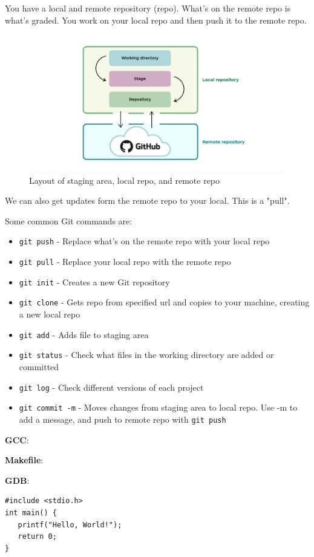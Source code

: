 \documentclass[nobib]{tufte-handout}
\newcommand{\defn}[2]{\noindent\textbf{#1}:\ #2}
\begin{document}

You have a local and remote repository (repo). What's on the 
remote repo is what's graded. You work on your local repo 
and then push it to the remote repo. 
\begin{figure}
   \centering
   \includegraphics{images/workingdir-stage-local-remote.png}
   \caption{Layout of staging area, local repo, and remote repo}
   \label{fig:wdstagelocalremote} 
\end{figure}

We can also get updates form the remote repo to your local.
This is a "pull". 

Some common Git commands are:
\begin{itemize}
   \item \texttt{git push} - Replace what's on the remote repo with your local repo
   \item \texttt{git pull} - Replace your local repo with the remote repo
   \item \texttt{git init} - Creates a new Git repository
   \item \texttt{git clone} - Gets repo from specified url and copies to your machine, creating a new local repo
   \item \texttt{git add} - Adds file to staging area
   \item \texttt{git status} - Check what files in the working directory
   are added or committed
   \item \texttt{git log} - Check different versions of each project
   \item \texttt{git commit -m} - Moves changes from staging area to local repo. Use -m to add a message, and push
   to remote repo with \texttt{git push}
\end{itemize}

\defn{GCC}{}

\defn{Makefile}{}

\defn{GDB}{}

\begin{lstlisting}[label=some-code,caption=Example Code]
#include <stdio.h>
int main() {
   printf("Hello, World!");
   return 0;
}
\end{lstlisting}
\end{document}
